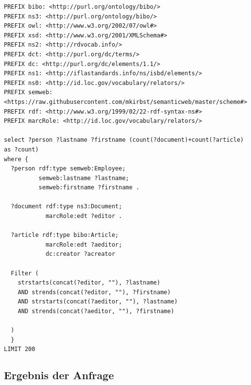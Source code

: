 \documentclass[parskip]{scrartcl}
\begin{document}
\begin{lstlisting}[captionpos=b, caption=SPARQL-Abfrage, label=SPARQL-Abfrage]
PREFIX bibo: <http://purl.org/ontology/bibo/>
PREFIX ns3: <http://purl.org/ontology/bibo/>
PREFIX owl: <http://www.w3.org/2002/07/owl#>
PREFIX xsd: <http://www.w3.org/2001/XMLSchema#>
PREFIX ns2: <http://rdvocab.info/>
PREFIX dct: <http://purl.org/dc/terms/>
PREFIX dc: <http://purl.org/dc/elements/1.1/>
PREFIX ns1: <http://iflastandards.info/ns/isbd/elements/>
PREFIX ns0: <http://id.loc.gov/vocabulary/relators/>
PREFIX semweb: <https://raw.githubusercontent.com/mkirbst/semanticweb/master/scheme#>
PREFIX rdf: <http://www.w3.org/1999/02/22-rdf-syntax-ns#>
PREFIX marcRole: <http://id.loc.gov/vocabulary/relators/>

select ?person ?lastname ?firstname (count(?document)+count(?article) as ?count)
where {
  ?person rdf:type semweb:Employee;
          semweb:lastname ?lastname;
          semweb:firstname ?firstname .
  
  ?document rdf:type ns3:Document;
            marcRole:edt ?editor .
  
  ?article rdf:type bibo:Article;
            marcRole:edt ?aeditor;
            dc:creator ?acreator
  
  Filter ( 
    strstarts(concat(?editor, ""), ?lastname)
    AND strends(concat(?editor, ""), ?firstname)
    AND strstarts(concat(?aeditor, ""), ?lastname)
    AND strends(concat(?aeditor, ""), ?firstname)
    
  )
  }
LIMIT 200
\end{lstlisting}

\clearpage
\subsection{Ergebnis der Anfrage}
\end{document}
